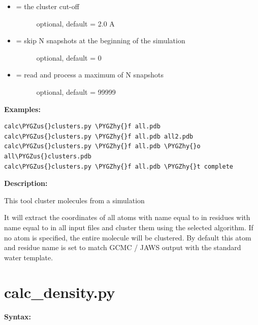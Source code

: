 \documentclass[letterpaper,10pt,english]{sphinxmanual}
\def\PYGZus{\char`\_}
\def\PYGZhy{\char`\-}
\begin{document}
\begin{itemize}
\begin{description}
\end{description}

\item {} \begin{description}
\item[{ = the cluster cut-off}] \leavevmode
optional, default = 2.0 A

\end{description}

\item {} \begin{description}
\item[{ = skip N snapshots at the beginning of the simulation}] \leavevmode
optional, default = 0

\end{description}

\item {} \begin{description}
\item[{ = read and process a maximum of N snapshots}] \leavevmode
optional, default = 99999

\end{description}

\end{itemize}

\textbf{Examples:}

\begin{Verbatim}[commandchars=\\\{\}]
calc\PYGZus{}clusters.py \PYGZhy{}f all.pdb
calc\PYGZus{}clusters.py \PYGZhy{}f all.pdb all2.pdb
calc\PYGZus{}clusters.py \PYGZhy{}f all.pdb \PYGZhy{}o all\PYGZus{}clusters.pdb
calc\PYGZus{}clusters.py \PYGZhy{}f all.pdb \PYGZhy{}t complete
\end{Verbatim}

\textbf{Description:}

This tool cluster molecules from a simulation

It will extract the coordinates of all atoms with name equal to  in residues with name equal to  in all input files and cluster them using the selected algorithm.  If no atom is specified, the entire molecule will be clustered. By default this atom and residue name is set to match GCMC / JAWS output with the standard water template.


\section{calc\_density.py}
\label{tools:calc-density-py}
\textbf{Syntax:}
\end{document}
